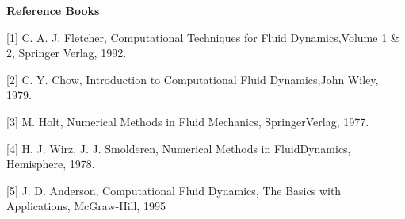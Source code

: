\textbf{Reference Books} 

[1] C. A. J. Fletcher, Computational Techniques for Fluid Dynamics,Volume 1 \& 2, Springer Verlag, 1992. 

[2] C. Y. Chow, Introduction to Computational Fluid Dynamics,John Wiley, 1979. 

[3] M. Holt, Numerical Methods in Fluid Mechanics, SpringerVerlag, 1977. 

[4] H. J. Wirz, J. J. Smolderen, Numerical Methods in FluidDynamics, Hemisphere, 1978. 

[5] J. D. Anderson, Computational Fluid Dynamics, The Basics with Applications, McGraw-Hill, 1995 

